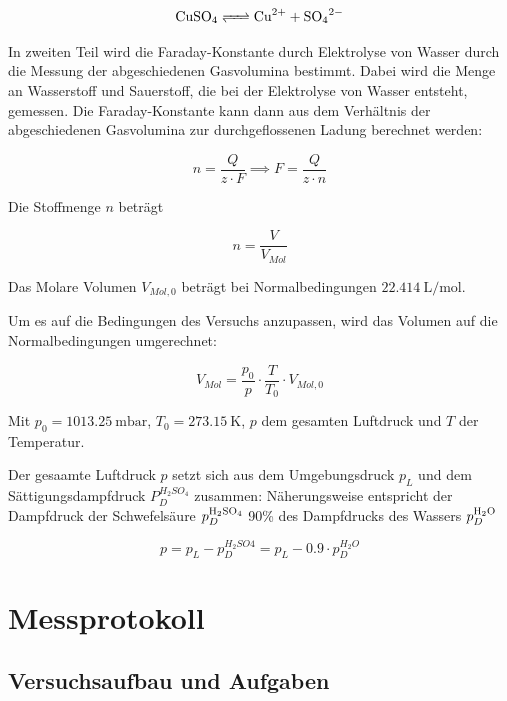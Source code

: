 \documentclass[12pt,a4paper,titlepage]{scrartcl}
\numberwithin{equation}{section}
\numberwithin{table}{section}
\numberwithin{figure}{section}
\begin{document}
\begin{equation}
    \ce{CuSO4 <=> Cu^{2+} + SO4^{2-}}
\end{equation}

In zweiten Teil wird die Faraday-Konstante durch Elektrolyse von Wasser durch die Messung der abgeschiedenen Gasvolumina bestimmt. Dabei wird die Menge an Wasserstoff und Sauerstoff, die bei der Elektrolyse von Wasser entsteht, gemessen. Die Faraday-Konstante kann dann aus dem Verhältnis der abgeschiedenen Gasvolumina zur durchgeflossenen Ladung berechnet werden:


\begin{equation}
    n = \frac{Q}{z \cdot F} \implies F = \frac{Q}{z \cdot n} \label{eq:calc_Faraday}
\end{equation}

Die Stoffmenge $n$ beträgt


\begin{equation}
    n = \frac{V}{V_{Mol}}
\end{equation}
 
Das Molare Volumen $V_{Mol, 0}$ beträgt bei Normalbedingungen $\qty{22.414}{\liter\per\mol}$.

Um es auf die Bedingungen des Versuchs anzupassen, wird das Volumen auf die Normalbedingungen umgerechnet:


\begin{equation}
    V_{Mol} = \frac{p_0}{p} \cdot \frac{T}{T_0} \cdot V_{Mol,0} \label{eq:calc_Volumes}
\end{equation}

Mit $p_0 = \qty{1013.25}{\milli\bar}$, $T_0 = \qty{273.15}{\kelvin}$, $p$ dem gesamten Luftdruck und $T$ der Temperatur.

Der gesaamte Luftdruck $p$ setzt sich aus dem Umgebungsdruck $p_{L}$ und dem Sättigungsdampfdruck $P_{D}^{H_2SO_4}$ zusammen:
Näherungsweise entspricht der Dampfdruck der Schwefelsäure $p_D^{\ce{H2SO4}}$ 90\% des Dampfdrucks des Wassers $p_D^{\ce{H2O}}$


\begin{equation}
    p = p_L - p_D^{H_2SO4} = p_L - 0.9 \cdot p_D^{H_2O}
\end{equation}




\section{Messprotokoll}
\subsection{Versuchsaufbau und Aufgaben}
    
\end{document}
